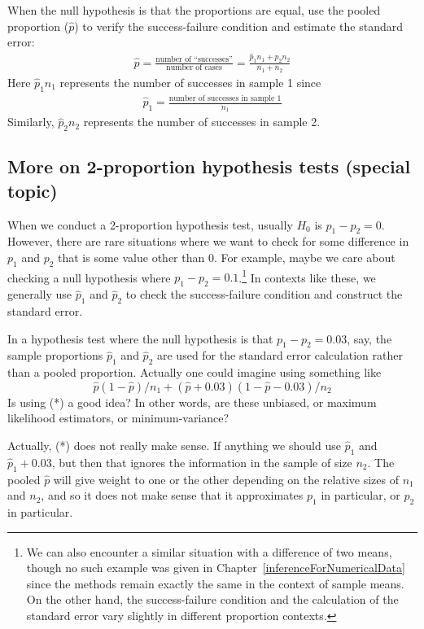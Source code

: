 \begin{termBox}{
When the null hypothesis is that the proportions are equal, use the pooled proportion ($\hat{p}$) to verify the success-failure condition and estimate the standard error:
\begin{eqnarray*}
\hat{p} = \frac{\text{number of ``successes''}}{\text{number of cases}} = \frac{\hat{p}_1n_1 + \hat{p}_2n_2}{n_1 + n_2}
\end{eqnarray*}
Here $\hat{p}_1n_1$ represents the number of successes in sample 1 since
\begin{eqnarray*}
\hat{p}_1 = \frac{\text{number of successes in sample 1}}{n_1}
\end{eqnarray*}
Similarly, $\hat{p}_2n_2$ represents the number of successes in sample 2.}
\end{termBox}


\subsection{More on 2-proportion hypothesis tests (special topic)}

When we conduct a 2-proportion hypothesis test, usually $H_0$ is $p_1 - p_2 = 0$. However, there are rare situations where we want to check for some difference in $p_1$ and $p_2$ that is some value other than 0. For example, maybe we care about checking a null hypothesis where $p_1 - p_2 = 0.1$.\footnote{We can also encounter a similar situation with a difference of two means, though no such example was given in Chapter~\ref{inferenceForNumericalData} since the methods remain exactly the same in the context of sample means. On the other hand, the success-failure condition and the calculation of the standard error vary slightly in different proportion contexts.} In contexts like these, we generally use $\hat{p}_1$ and $\hat{p}_2$ to check the success-failure condition and construct the standard error.

In a hypothesis test where the null hypothesis is that $p_1 - p_2 = 0.03$, say, the sample proportions $\hat p_1$ and $\hat p_2$ are used for the standard error calculation rather than a pooled proportion. Actually one could imagine using something like
\[
	\hat p(1-\hat p)/n_1 + (\hat p+0.03)(1-\hat p-0.03)/n_2\tag{*}
\]
Is using (*) a good idea?
In other words, are these unbiased, or maximum likelihood estimators, or minimum-variance?

Actually, (*) does not really make sense. If anything we should use $\hat p_1$ and $\hat p_1+0.03$, but then that ignores the information in the sample of size $n_2$.
The pooled $\hat p$ will give weight to one or the other depending on the relative sizes of $n_1$ and $n_2$, and so it does not make sense that it approximates $p_1$ in particular, or $p_2$ in particular.

